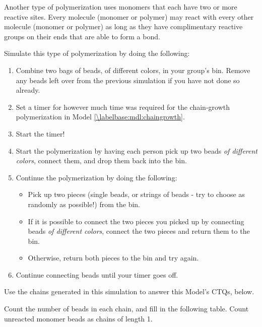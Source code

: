 \begin{activity}
\begin{model}
	Another type of polymerization uses monomers that each have two or more reactive sites.  Every molecule (monomer or polymer) may react with every other molecule (monomer or polymer) as long as they have complimentary reactive groups on their ends that are able to form a bond.
	
	Simulate this type of polymerization by doing the following:
	\begin{enumerate}
		\item Combine two bags of beads, of different colors, in your group's bin.  Remove any beads left over from the previous simulation if you have not done so already.
		\item Set a timer for however much time was required for the chain-growth polymerization in Model \ref{\labelbase:mdl:chaingrowth}.
		\item Start the timer!
		\item Start the polymerization by having each person pick up two beads \emph{of different colors}, connect them, and drop them back into the bin.
		\item Continue the polymerization by doing the following:
			\begin{itemize}
				\item Pick up two pieces (single beads, or strings of beads - try to choose as randomly as possible!) from the bin.
				\item If it is possible to connect the two pieces you picked up by connecting beads \emph{of different colors}, connect the two pieces and return them to the bin.
				\item Otherwise, return both pieces to the bin and try again.
			\end{itemize}
		\item Continue connecting beads until your timer goes off.
	\end{enumerate}
	
	Use the chains generated in this simulation to answer this Model's CTQs, below.

\end{model}
	
\begin{ctqs}

	\question Count the number of beads in each chain, and fill in the following table.  Count unreacted monomer beads as chains of length 1. \label{\labelbase:ctq:numbeadsstep}
		

\end{ctqs}
\end{activity}
